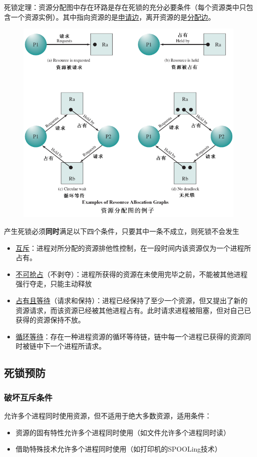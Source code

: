 死锁定理：资源分配图中存在环路是存在死锁的充分必要条件（每个资源类中只包含一个资源实例）。其中指向资源的是\underline{申请边}，离开资源的是\underline{分配边}。
\begin{figure}[H]
    \centering
    \includegraphics[width=0.6\linewidth]{fig/resource_graph.png}
\end{figure}

产生死锁必须\textbf{同时}满足以下四个条件，只要其中一条不成立，则死锁不会发生
\begin{itemize}
    \item \underline{互斥}：进程对所分配的资源排他性控制，在一段时间内该资源仅为一个进程所占有。
    \item \underline{不可抢占}（不剥夺）：进程所获得的资源在未使用完毕之前，不能被其他进程强行夺走，只能主动释放
    \item \underline{占有且等待}（请求和保持）：进程已经保持了至少一个资源，但又提出了新的资源请求，而该资源已经被其他进程占有。此时请求进程被阻塞，但对自己已获得的资源保持不放。
    \item \underline{循环等待}：存在一种进程资源的循环等待链，链中每一个进程已获得的资源同时被链中下一个进程所请求。
\end{itemize}

\subsection{死锁预防}
\subsubsection{破坏互斥条件}
允许多个进程同时使用资源，但不适用于绝大多数资源，适用条件：
\begin{itemize}
\item 资源的固有特性允许多个进程同时使用（如文件允许多个进程同时读）
\item 借助特殊技术允许多个进程同时使用（如打印机的SPOOLing技术）
\end{itemize}

